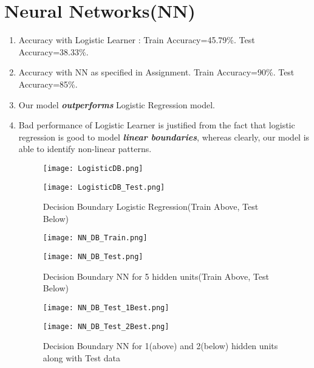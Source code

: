 \documentclass{article}
\newcommand{\italb}[1]{\textbf{\textit{#1}}}
\begin{document}
\section*{Neural Networks(NN)}
\begin{enumerate}
	\item Accuracy with Logistic Learner : Train Accuracy=45.79\%. Test Accuracy=38.33\%.
	\item Accuracy with NN as specified in Assignment. Train Accuracy=90\%. Test Accuracy=85\%.
	\item Our model \italb{outperforms} Logistic Regression model. 
	\item Bad performance of Logistic Learner is justified from the fact that logistic regression is good to model \italb{linear boundaries}, whereas clearly, our model is able to identify non-linear patterns.

\begin{figure}[h]
\vspace*{-2cm}
\hspace*{-1.5cm}
\centering
\texttt{[image: LogisticDB.png]}
\vspace*{-1.5cm}
\caption{Decision Boundary Logistic Regression(Train Above, Test Below)}
\hspace*{-1.5cm}
\centering
\texttt{[image: LogisticDB\_Test.png]}
\end{figure}

\begin{figure}[h]
\vspace*{-2cm}
\hspace*{-1.5cm}
\centering
\texttt{[image: NN\_DB\_Train.png]}
\vspace*{-1.5cm}
\caption{Decision Boundary NN for 5 hidden units(Train Above, Test Below)}
\hspace*{-1.5cm}
\centering
\texttt{[image: NN\_DB\_Test.png]}
\end{figure}

\begin{figure}[h]
\vspace*{-2cm}
\hspace*{-1.5cm}
\centering
\texttt{[image: NN\_DB\_Test\_1Best.png]}
\vspace*{-1.5cm}
\caption{Decision Boundary NN for 1(above) and 2(below) hidden units along with Test data}
\hspace*{-1.5cm}
\centering
\texttt{[image: NN\_DB\_Test\_2Best.png]}
\end{figure}


\end{enumerate}
\end{document}
